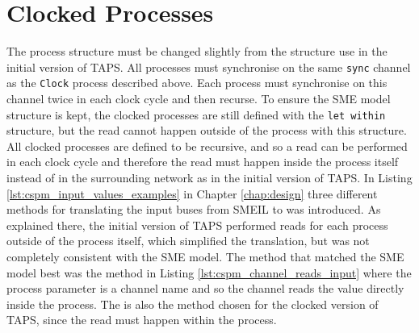\section{Clocked Processes}
The process structure must be changed slightly from the structure use in the initial version of TAPS. All processes must synchronise on the same \texttt{sync} channel as the \texttt{Clock} process described above. Each process must synchronise on this channel twice in each clock cycle and then recurse. To ensure the SME model structure is kept, the clocked processes are still defined with the \texttt{let within} structure, but the read cannot happen outside of the process with this structure. All clocked processes are defined to be recursive, and so a read can be performed in each clock cycle and therefore the read must happen inside the process itself instead of in the surrounding network as in the initial version of TAPS.
In Listing \ref{lst:cspm_input_values_examples} in Chapter \ref{chap:design} three different methods for translating the input buses from SMEIL to \cspm{} was introduced. As explained there, the initial version of TAPS performed reads for each process outside of the process itself, which simplified the translation, but was not completely consistent with the SME model. The method that matched the SME model best was the method in Listing \ref{lst:cspm_channel_reads_input} where the process parameter is a channel name and so the channel reads the value directly inside the process. The is also the method chosen for the clocked version of TAPS, since the read must happen within the process. \\

